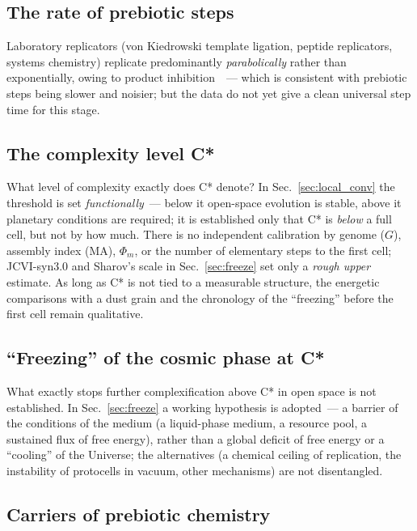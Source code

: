 \documentclass[11pt,a4paper]{article}
\begin{document}
\subsection{The rate of prebiotic steps}
\label{sec:open_prebiotic_tempo}

Laboratory replicators (von Kiedrowski template ligation, peptide replicators, systems chemistry) replicate predominantly \emph{parabolically} rather than exponentially, owing to product inhibition~\cite{Adamski2020}~--- which is consistent with prebiotic steps being slower and noisier; but the data do not yet give a clean universal step time for this stage.

\subsection{The complexity level C*}
\label{sec:open_cstar_level}

What level of complexity exactly does C* denote? In Sec.~\ref{sec:local_conv} the threshold is set \emph{functionally}~--- below it open-space evolution is stable, above it planetary conditions are required; it is established only that C* is \emph{below} a full cell, but not by how much. There is no independent calibration by genome ($G$), assembly index (MA), $\Phi_m$, or the number of elementary steps to the first cell; JCVI-syn3.0 and Sharov's scale in Sec.~\ref{sec:freeze} set only a \emph{rough upper} estimate. As long as C* is not tied to a measurable structure, the energetic comparisons with a dust grain and the chronology of the ``freezing'' before the first cell remain qualitative.

\subsection{``Freezing'' of the cosmic phase at C*}
\label{sec:open_freeze}

What exactly stops further complexification above C* in open space is not established. In Sec.~\ref{sec:freeze} a working hypothesis is adopted~--- a barrier of the conditions of the medium (a liquid-phase medium, a resource pool, a sustained flux of free energy), rather than a global deficit of free energy or a ``cooling'' of the Universe; the alternatives (a chemical ceiling of replication, the instability of protocells in vacuum, other mechanisms) are not disentangled.

\subsection{Carriers of prebiotic chemistry}
\label{sec:open_carriers}
\end{document}
